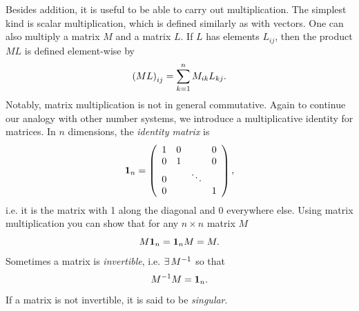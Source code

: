 Besides addition, it is useful to be able to carry out multiplication.
The simplest kind is scalar multiplication,
which is defined similarly as with vectors.
One can also multiply a matrix $M$ and a matrix $L$. If $L$ has elements
$L_{ij}$, then the product $ML$ is defined element-wise by
\begin{equation}
  \left(ML\right)_{ij}=\sum_{k=1}^n M_{ik}L_{kj}.
\end{equation}
Notably, matrix multiplication is not in general commutative.
Again to continue our analogy with other number systems,
we introduce a multiplicative identity for matrices.
In $n$ dimensions, the {\it identity matrix} is
\begin{equation}\index{identity!matrix}\index{matrix!identity}
  \id_n=\left(\begin{array}{cccc}
          1   & 0 &       & 0\\
          0   & 1 &       & 0\\
          0   &   & \ddots& \\
          0   &   &       & 1
            \end{array}\right), 
\end{equation}
i.e. it is the matrix with 1 along the diagonal and 0 everywhere else. Using
matrix multiplication you can show that for any $n\times n$ matrix $M$
\begin{equation}
  M{\mathbf 1}_n ={\mathbf 1}_n M = M.
\end{equation}
Sometimes a matrix is {\it invertible}, 
i.e. $\operatorname{\exists} M^{-1}$ so that
\begin{equation}
  M^{-1} M={\mathbf 1}_n. 
\end{equation}
If a matrix is not invertible, it is said to be 
{\it singular}.

